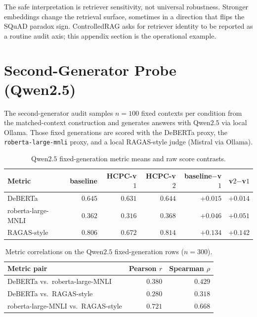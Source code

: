 The safe interpretation is retriever sensitivity, not universal
robustness. Stronger embeddings change the retrieval surface, sometimes
in a direction that flips the SQuAD paradox sign. ControlledRAG asks
for retriever identity to be reported as a routine audit axis;
this appendix section is the operational example.

\section{Second-Generator Probe (Qwen2.5)}
\label{app:qwen_probe}

The second-generator audit samples $n=100$ fixed contexts per condition
from the matched-context construction and generates answers with
Qwen$2.5$ via local Ollama. Those fixed generations are scored with
the DeBERTa proxy, the \texttt{roberta-large-mnli} proxy, and a local
RAGAS-style judge (Mistral via Ollama).

\begin{table}[!htb]
\centering
\caption{Qwen$2.5$ fixed-generation metric means and raw score
contrasts.}
\footnotesize
\begin{tabular}{lrrrrr}
\toprule
Metric & baseline & HCPC-v$1$ & HCPC-v$2$ & baseline$-$v$1$ & v$2$$-$v$1$ \\
\midrule
DeBERTa             & $0.645$ & $0.631$ & $0.644$ & $+0.015$ & $+0.014$ \\
roberta-large-MNLI  & $0.362$ & $0.316$ & $0.368$ & $+0.046$ & $+0.051$ \\
RAGAS-style         & $0.806$ & $0.672$ & $0.814$ & $+0.134$ & $+0.142$ \\
\bottomrule
\end{tabular}
\end{table}

\begin{table}[!htb]
\centering
\caption{Metric correlations on the Qwen$2.5$ fixed-generation rows
($n=300$).}
\footnotesize
\begin{tabular}{lrr}
\toprule
Metric pair & Pearson $r$ & Spearman $\rho$ \\
\midrule
DeBERTa vs.\ roberta-large-MNLI       & $0.380$ & $0.429$ \\
DeBERTa vs.\ RAGAS-style              & $0.280$ & $0.318$ \\
roberta-large-MNLI vs.\ RAGAS-style   & $0.721$ & $0.668$ \\
\bottomrule
\end{tabular}
\end{table}

